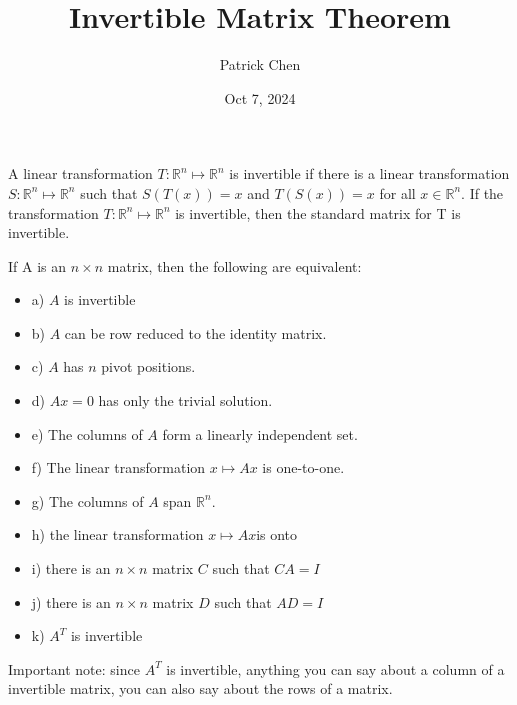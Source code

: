 \documentclass{article}
\title{Invertible Matrix Theorem}
\author{Patrick Chen}
\date{Oct 7, 2024}
\theoremstyle{mytheoremstyle}
\theoremstyle{mytheoremstyle}
\theoremstyle{myproblemstyle}
\begin{document}
    \maketitle
    A linear transformation $T: \mathbb{R}^n \mapsto \mathbb{R}^n$ is
    invertible if there is a linear transformation $S: \mathbb{R}^n \mapsto
    \mathbb{R}^n$ such that $S(T(x))=x$ and $T(S(x))=x$ for all $x\in
    \mathbb{R}^n$. If the transformation $T: \mathbb{R}^n \mapsto \mathbb{R}^n$
    is invertible, then the standard matrix for T is invertible.

    If A is an $n\times n$ matrix, then the following are equivalent:
    \begin{itemize}
        \item a) $A$ is invertible
        \item b) $A$ can be row reduced to the identity matrix.
        \item c) $A$ has $n$ pivot positions.
        \item d) $Ax = 0$ has only the trivial solution.
        \item e) The columns of $A$ form a linearly independent set.
        \item f) The linear transformation $x\mapsto Ax$ is one-to-one.
        \item g) The columns of $A$ span $\mathbb{R}^n$.
        \item h) the linear transformation $x\mapsto Ax$is onto
        \item i) there is an $n\times n$ matrix $C$ such that $CA=I$
        \item j) there is an $n\times n$ matrix $D$ such that $AD=I$
        \item k) $A^T$ is invertible
    \end{itemize}

    Important note: since $A^T$ is invertible, anything you can say about a
    column of a invertible matrix, you can also say about the rows of a matrix.
\end{document}
